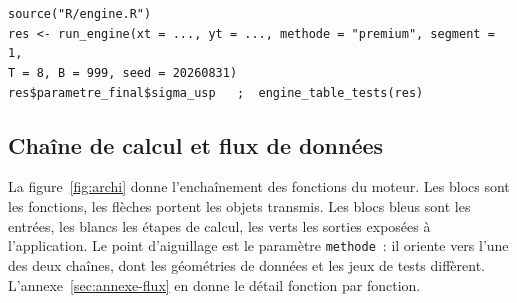 \documentclass[a4paper,11pt]{article}
\newcommand{\code}[1]{\texttt{\small #1}}
\begin{document}
\begin{encadre}
\small
\code{source("R/engine.R")}\\
\code{res <- run\_engine(xt = ..., yt = ..., methode = "premium", segment = 1,}\\
\code{\phantom{res <- run\_engine(}T = 8, B = 999, seed = 20260831)}\\
\code{res\$parametre\_final\$sigma\_usp \ \ ;\ \ engine\_table\_tests(res)}
\end{encadre}

\subsection{Chaîne de calcul et flux de données}

La figure~\ref{fig:archi} donne l'enchaînement des fonctions du moteur. Les blocs
sont les fonctions, les flèches portent les objets transmis. Les blocs bleus sont
les entrées, les blancs les étapes de calcul, les verts les sorties exposées à
l'application. Le point d'aiguillage est le paramètre \code{methode}~: il oriente
vers l'une des deux chaînes, dont les géométries de données et les jeux de tests
diffèrent. L'annexe~\ref{sec:annexe-flux} en donne le détail fonction par
fonction.
\end{document}
